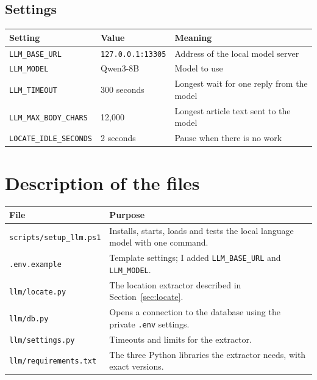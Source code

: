 \documentclass[11pt,a4paper]{article}
\begin{document}
\subsection{Settings}

\begin{center}
\begin{tabular}{|l|l|p{6cm}|}
\hline
\textbf{Setting} & \textbf{Value} & \textbf{Meaning} \\
\hline
\texttt{LLM\_BASE\_URL} & \texttt{127.0.0.1:13305} & Address of the local model server \\
\hline
\texttt{LLM\_MODEL} & Qwen3-8B & Model to use \\
\hline
\texttt{LLM\_TIMEOUT} & 300 seconds & Longest wait for one reply from the model \\
\hline
\texttt{LLM\_MAX\_BODY\_CHARS} & 12{,}000 & Longest article text sent to the model \\
\hline
\texttt{LOCATE\_IDLE\_SECONDS} & 2 seconds & Pause when there is no work \\
\hline
\end{tabular}
\end{center}

\section{Description of the files}

\begin{center}
\begin{tabular}{|l|p{9cm}|}
\hline
\textbf{File} & \textbf{Purpose} \\
\hline
\texttt{scripts/setup\_llm.ps1} & Installs, starts, loads and tests the local language model with one command. \\
\hline
\texttt{.env.example} & Template settings; I added \texttt{LLM\_BASE\_URL} and \texttt{LLM\_MODEL}. \\
\hline
\texttt{llm/locate.py} & The location extractor described in Section~\ref{sec:locate}. \\
\hline
\texttt{llm/db.py} & Opens a connection to the database using the private \texttt{.env} settings. \\
\hline
\texttt{llm/settings.py} & Timeouts and limits for the extractor. \\
\hline
\texttt{llm/requirements.txt} & The three Python libraries the extractor needs, with exact versions. \\
\hline
\end{tabular}
\end{center}
\end{document}
